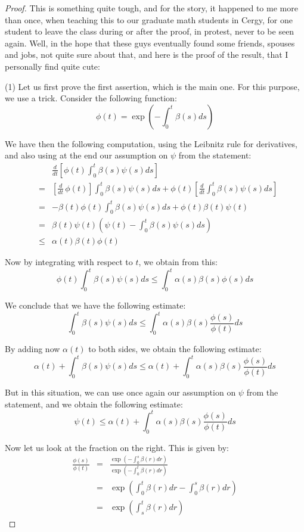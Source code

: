 \documentclass[12pt]{amsbook}
\begin{document}
\begin{proof}
This is something quite tough, and for the story, it happened to me more than once, when teaching this to our graduate math students in Cergy, for one student to leave the class during or after the proof, in protest, never to be seen again. Well, in the hope that these guys  eventually found some friends, spouses and jobs, not quite sure about that, and here is the proof of the result, that I personally find quite cute:

\medskip

(1) Let us first prove the first assertion, which is the main one. For this purpose, we use a trick. Consider the following function:
$$\phi(t)=\exp\left(-\int_0^t\beta(s)ds\right)$$

We have then the following computation, using the Leibnitz rule for derivatives, and also using at the end our assumption on $\psi$ from the statement:
\begin{eqnarray*}
&&\frac{d}{dt}\left[\phi(t)\int_0^t\beta(s)\psi(s)ds\right]\\
&=&\left[\frac{d}{dt}\,\phi(t)\right]\int_0^t\beta(s)\psi(s)ds+\phi(t)\left[\frac{d}{dt}\int_0^t\beta(s)\psi(s)ds\right]\\
&=&-\beta(t)\phi(t)\int_0^t\beta(s)\psi(s)ds+\phi(t)\beta(t)\psi(t)\\
&=&\beta(t)\psi(t)\left(\psi(t)-\int_0^t\beta(s)\psi(s)ds\right)\\
&\leq&\alpha(t)\beta(t)\phi(t)
\end{eqnarray*}

Now by integrating with respect to $t$, we obtain from this:
$$\phi(t)\int_0^t\beta(s)\psi(s)ds\leq\int_0^t\alpha(s)\beta(s)\phi(s)ds$$

We conclude that we have the following estimate:
$$\int_0^t\beta(s)\psi(s)ds\leq\int_0^t\alpha(s)\beta(s)\frac{\phi(s)}{\phi(t)}ds$$

By adding now $\alpha(t)$ to both sides, we obtain the following estimate:
$$\alpha(t)+\int_0^t\beta(s)\psi(s)ds\leq\alpha(t)+\int_0^t\alpha(s)\beta(s)\frac{\phi(s)}{\phi(t)}ds$$

But in this situation, we can use once again our assumption on $\psi$ from the statement, and we obtain the following estimate:
$$\psi(t)\leq\alpha(t)+\int_0^t\alpha(s)\beta(s)\frac{\phi(s)}{\phi(t)}ds$$

Now let us look at the fraction on the right. This is given by:
\begin{eqnarray*}
\frac{\phi(s)}{\phi(t)}
&=&\frac{\exp\left(-\int_0^s\beta(r)dr\right)}{\exp\left(-\int_0^t\beta(r)dr\right)}\\
&=&\exp\left(\int_0^t\beta(r)dr-\int_0^s\beta(r)dr\right)\\
&=&\exp\left(\int_s^t\beta(r)dr\right)
\end{eqnarray*}


\end{proof}
\end{document}
